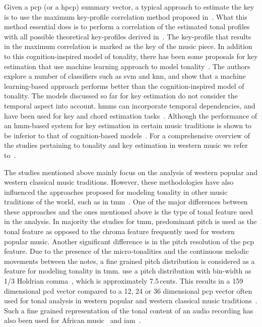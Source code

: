 Given a \gls{pcp} (or a \gls{hpcp}) summary vector, a typical approach to estimate the key is to use the maximum key-profile correlation method proposed in~\cite{krumhansl2001cognitive}. What this method essential does is to perform a correlation of the estimated tonal profiles with all possible theoretical key-profiles derived in~\cite{KrumhanslKessler82}. The key-profile that results in the maximum correlation is marked as the key of the music piece. In addition to this cognition-inspired model of tonality, there has been some proposals for key estimation that use machine learning approach to model tonality~\citep{gomez2004estimating}. The authors explore a number of classifiers such as \gls{svm} and \gls{knn}, and show that a machine learning-based approach performs better than the cognition-inspired model of tonality. The models discussed so far for key estimation do not consider the temporal aspect into account. \glspl{hmm} can incorporate temporal dependencies, and have been used for key and chord estimation tasks~\citep{noland2006key,peeters2006musical,papadopoulos2007large}. Although the performance of an \gls{hmm}-based system for key estimation in certain music traditions is shown to be inferior to that of cognition-based models~\citep{peeters2006musical}. For a comprehensive overview of the studies pertaining to tonality and key estimation in western music we refer to~\cite{gomez2006tonal}.

The studies mentioned above mainly focus on the analysis of western popular and western classical music traditions. However, these methodologies have also influenced the approaches proposed for modeling tonality in other music traditions of the world, such as in \gls{tmm}~\citep{gedik2010pitch,gedik2009evaluation,bozkurt2008automatic}. One of the major differences between these approaches and the ones mentioned above is the type of tonal feature used in the analysis. In majority the studies for \gls{tmm}, predominant pitch is used as the tonal feature as opposed to the chroma feature frequently used for western popular music. Another significant difference is in the pitch resolution of the \gls{pcp} feature. Due to the presence of the micro-tonalities and the continuous melodic movements between the notes, a fine grained pitch distribution is considered as a feature for modeling tonality in \gls{tmm}. \cite{bozkurt2008automatic,gedik2010pitch} use a pitch distribution with bin-width as 1/3 Holdrian comma~\citep{akkocc2002non}, which is approximately 7.5\,cents. This results in a 159 dimensional \gls{pcd} vector compared to a 12, 24 or 36 dimensional \gls{pcp} vector often used for tonal analysis in western popular and western classical music traditions~\citep{gomez2006tonal}. Such a fine grained representation of the tonal content of an audio recording has also been used for African music~\citep{moelants2009exploring} and \acrfull{iam}~\citep{chordia2013joint}. 


